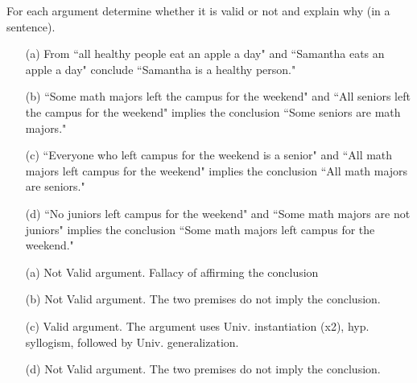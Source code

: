 \documentclass[11pt,addpoints]{exam}
\begin{document}
\begin{questions}
\question[8] For each argument determine whether it is valid or not and explain why (in a sentence).
    \begin{itemize}[itemsep=0pt,parsep=0pt,topsep=0pt,partopsep=0pt]
    \item[(a)] From  ``all healthy people eat an apple a day" and  ``Samantha eats an apple a day" conclude ``Samantha is a healthy person."  
    \item[(b)] ``Some math majors left the campus for the weekend" and ``All seniors left the campus for the weekend" implies the conclusion ``Some seniors are math majors."
    \item[(c)] ``Everyone who left campus for the weekend is a senior" and ``All math majors left campus for the weekend"  implies the conclusion ``All math majors are seniors." 
    \item[(d)] ``No juniors left campus for the weekend" and ``Some math majors are not juniors" implies the conclusion ``Some math majors left campus for the weekend."
    \end{itemize}
   \ifprintanswers
        \vspace{-10pt}
    \fi
\begin{solution}
    \begin{itemize}
        \item[(a)] Not Valid argument.  Fallacy of affirming the conclusion
		\item[(b)] Not Valid argument.  The two premises do not imply the conclusion.
        \item[(c)] Valid argument. The argument uses Univ. instantiation (x2), hyp. syllogism, followed by Univ. generalization.
        \item[(d)] Not Valid argument.  The two premises do not imply the conclusion.
    \end{itemize}
\end{solution}


\ifprintanswers
\else
{}

\smallskip
{}


\end{questions}
\end{document}
